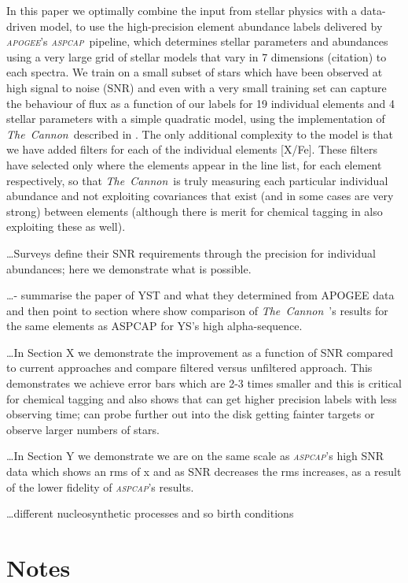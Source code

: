 \documentclass[12pt, preprint]{aastex}
\newcommand{\project}[1]{\textsl{#1}}
\newcommand{\tc}{\project{The~Cannon}}
\newcommand{\apogee}{\project{\textsc{apogee}}}
\newcommand{\aspcap}{\project{\textsc{aspcap}}}
\begin{document}
In this paper we optimally combine the input from stellar physics with a data-driven model, to use the high-precision element abundance labels delivered by \apogee's \aspcap\ pipeline, which determines stellar parameters and abundances using a very large grid of stellar models that vary in 7 dimensions (citation) to each spectra. We train on a small subset of stars which have been observed at high signal to noise (SNR) and even with a very small training set can capture the behaviour of flux as a function of our labels for 19 individual elements and 4 stellar parameters with a simple quadratic model, using the implementation of \tc\   described in \citet{Ness2015}. The only additional complexity to the model is that we have added filters for each of the individual elements [X/Fe]. These filters have selected only where the elements appear in the line list, for each element respectively, so that \tc\ is truly measuring each particular individual abundance and not exploiting covariances that exist (and in some cases are very strong) between elements (although there is merit for chemical tagging in also exploiting these as well). 

\ldots Surveys define their SNR requirements through the precision for individual abundances; here we demonstrate what is possible.

\ldots - summarise the paper of YST and what they determined from APOGEE data and then point to section where show comparison of \tc\  's results for the same elements as ASPCAP for YS's high alpha-sequence.


\ldots In Section X we demonstrate the improvement as a function of SNR compared to current approaches and compare filtered versus unfiltered approach. This demonstrates we achieve error bars which are 2-3 times smaller and this is critical for chemical tagging and also shows that can get higher precision labels with less observing time; can probe further out into the disk getting fainter targets or observe larger numbers of stars. 
 
 \ldots In Section Y we demonstrate we are on the same scale as \aspcap's high SNR data which shows an rms of x and as SNR decreases the rms increases, as a result of the lower fidelity of \aspcap's results. 


\ldots different nucleosynthetic processes and so birth conditions \\ 

\section{Notes} 
\end{document}
